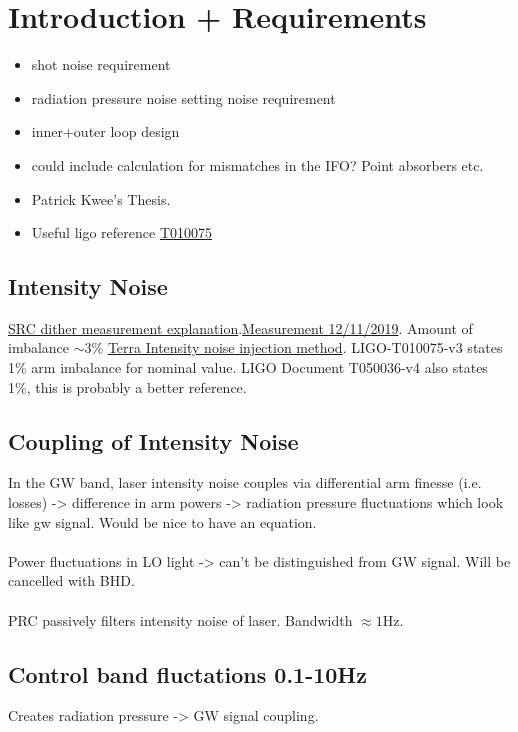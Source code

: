 \section{Introduction + Requirements}
\begin{itemize}
	\item shot noise requirement
	\item radiation pressure noise setting noise requirement
	\item inner+outer loop design
	\item could include calculation for mismatches in the IFO? Point absorbers etc. 
	\item Patrick Kwee's Thesis. 
	\item Useful ligo reference \href{https://dcc.ligo.org/cgi-bin/DocDB/ShowDocument?docid=T010075}{T010075}
\end{itemize}
\subsection{Intensity Noise}
\href{https://alog.ligo-wa.caltech.edu/aLOG/uploads/46276_20190107234129_SRCLArmPowerMeas.pdf}{SRC dither measurement explanation}.\href{https://alog.ligo-la.caltech.edu/aLOG/index.php}{Measurement 12/11/2019}. Amount of imbalance  $\sim 3\%$ \href{https://alog.ligo-la.caltech.edu/aLOG/index.php?callRep=43298}{Terra Intensity noise injection method}. LIGO-T010075-v3 states 1\% arm imbalance for nominal value. LIGO Document T050036-v4 also states 1\%, this is probably a better reference.
\subsection{Coupling of Intensity Noise}
In the GW band, laser intensity noise couples via differential arm finesse (i.e. losses) -> difference in arm powers -> radiation pressure fluctuations which look like gw signal. Would be nice to have an equation.
\paragraph{}
Power fluctuations in LO light -> can't be distinguished from GW signal. Will be cancelled with BHD.
\paragraph{}
PRC passively filters intensity noise of laser. Bandwidth $\approx 1\si{\hertz}$.
\subsection{Control band fluctations 0.1-10Hz}
Creates radiation pressure -> GW signal coupling. 
